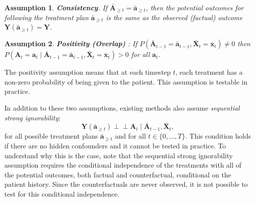 \documentclass{article}
\newtheorem{assumption}{Assumption}
\newcommand{\vc}[1]{\mathbf{#1}}
\newcommand{\ci}{\perp\!\!\!\perp}
\newcommand{\hist}[1]{\bar{\vc{#1}}}
\begin{document}
	
	\begin{assumption}
	\textbf{Consistency}.  If $\bar{\vc{A}}_{\geq t} = \hist{a}_{\geq t}$, then the potential outcomes for following the treatment plan $\hist{a}_{\geq t}$ is the same as the observed (factual) outcome $\vc{Y}(\bar{\vc{a}}_{\geq t}) = \vc{Y}$.
	\end{assumption}
	
	\begin{assumption}
	\textbf{Positivity (Overlap)} \cite{imai2004causal}: 
	If $P( \hist{A}_{t-1} = \hist{a}_{t-1}, \hist{X}_t = \hist{x}_t)\neq 0$ then $P(\vc{A}_t = \vc{a}_t \mid \hist{A}_{t-1} = \hist{a}_{t-1}, \hist{X}_t = \hist{x}_t) > 0$ for all $\vc{a}_t$.
	\end{assumption}
	
	The positivity assumption means that at each timestep $t$, each treatment has a non-zero probability of being given to the patient. This assumption is testable in practice. 
	
	In addition to these two assumptions, existing methods also assume \textit{sequential strong ignorability}:
	\begin{equation}
	\vc{Y}(\hist{a}_{\geq t}) \ci \vc{A}_t \mid \hist{A}_{t-1}, \hist{X}_t,
	\end{equation}
	for all possible treatment plans $\hist{a}_{\geq t}$ and  for all $t\in \{0, \dots, T\}$. This condition holds if there are no hidden confounders and it cannot be tested in practice. To understand why this is the case, note that the sequential strong ignorability assumption requires the conditional independence of the treatments with all of the potential outcomes, both factual and counterfactual, conditional on the patient history. Since the counterfactuals are never observed, it is not possible to test for this conditional independence. 
	
\end{document}
